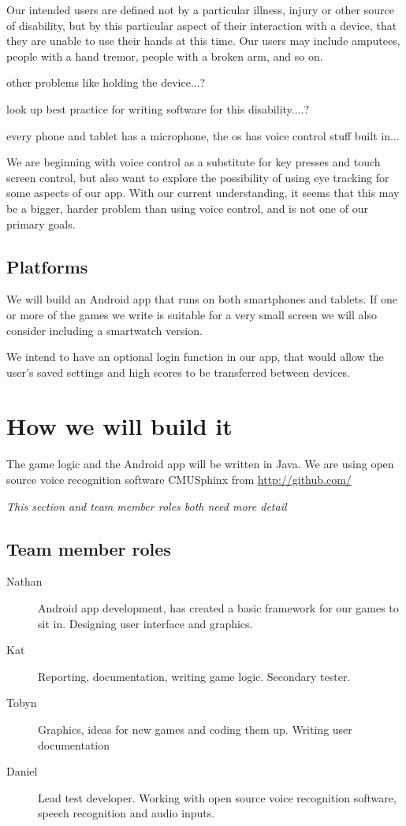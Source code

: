 \documentclass[11pt, oneside]{article}
\begin{document}
Our intended users are defined not by a particular illness, injury
or other source of disability, but by this particular aspect of their
interaction with a device, that they are unable to use their hands at
this time. Our users may include amputees, people with a hand tremor,
people with a broken arm, and so on.

other problems like holding the device...?

look up best practice for writing software for this disability....?

every phone and tablet has a microphone, the os has voice control stuff built in...

We are beginning with voice control as a substitute for key presses
and touch screen control, but also want to explore the possibility of
using eye tracking for some aspects of our app. With our current
understanding, it seems that this may be a bigger, harder problem
than using voice control, and is not one of our primary goals.


\subsection*{Platforms}

We will build an Android app that runs on both smartphones and
tablets. If one or more of the games we write is suitable for a very
small screen we will also consider including a smartwatch version.

We intend to have an optional login function in our app, that would
allow the user's saved settings and high scores to be transferred between
devices.


\section*{How we will build it}

The game logic and the Android app will be written in Java. We are
using open source voice recognition software CMUSphinx from \url{http://github.com/}



{\em This section and team member roles both need more detail}

\subsection*{Team member roles}

\begin{description}
\item [Nathan] Android app development, has created a basic framework
  for our games to sit in. Designing user interface and graphics.
\item [Kat] Reporting, documentation, writing game logic. Secondary tester.
\item [Tobyn] Graphics, ideas for new games and coding them
  up. Writing user documentation
\item [Daniel] Lead test developer. Working with open source voice
  recognition software, speech recognition and audio inputs.
\end{description}
\end{document}
